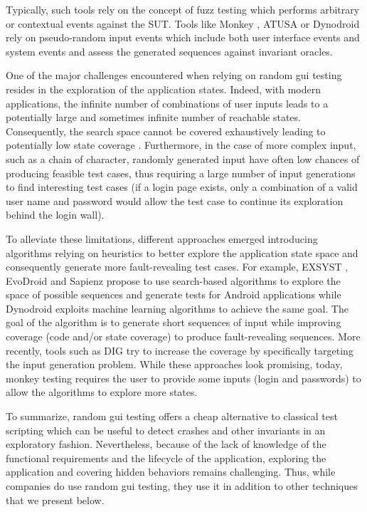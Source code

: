 Typically, such tools rely on the concept of fuzz testing which performs arbitrary or contextual events against the SUT. Tools like Monkey \cite{Google2020},  ATUSA \cite{Mesbah2012} or Dynodroid \cite{Machiry2013} rely on pseudo-random input events which include both user interface events and system events and assess the generated sequences against invariant oracles. 

One of the major challenges encountered when relying on random \gls{gui} testing resides in the exploration of the application states. Indeed, with modern applications, the infinite number of combinations of user inputs leads to a potentially large and sometimes infinite number of reachable states. Consequently, the search space cannot be covered exhaustively leading to potentially low state coverage \cite{Canny2019}. Furthermore, in the case of more complex input, such as a chain of character, randomly generated input have often low chances of producing feasible test cases, thus requiring a large number of input generations to find interesting test cases (\eg if a login page exists, only a combination of a valid user name and password would allow the test case to continue its exploration behind the login wall).

To alleviate these limitations, different approaches emerged introducing algorithms relying on heuristics to better explore the application state space and consequently generate more fault-revealing test cases. For example, EXSYST \cite{Gross2012}, EvoDroid \cite{Mahmood2014} and Sapienz \cite{Mao2016} propose to use search-based algorithms to explore the space of possible sequences and generate tests for Android applications while Dynodroid \cite{Machiry2013} exploits machine learning algorithms to achieve the same goal. The goal of the algorithm is to generate short sequences of input while improving coverage (code \cite{Gross2012} and/or state \cite{Machiry2013} coverage) to produce fault-revealing sequences. More recently, tools such as DIG \cite{Biagiola2019} try to increase the coverage by specifically targeting the input generation problem. While these approaches look promising, today, monkey testing requires the user to provide some inputs (\eg login and passwords) to allow the algorithms to explore more states.

To summarize, random \gls{gui} testing offers a cheap alternative to classical test scripting which can be useful to detect crashes and other invariants in an exploratory fashion. Nevertheless, because of the lack of knowledge of the functional requirements and the lifecycle of the application, exploring the application and covering hidden behaviors remains challenging. Thus, while companies do use random \gls{gui} testing, they use it in addition to other techniques that we present below.


